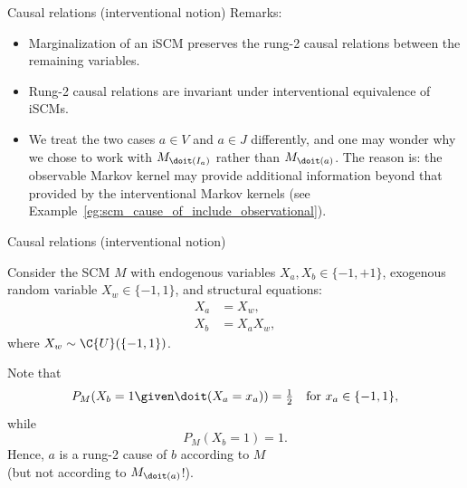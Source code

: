 \begin{frame}{Causal relations (interventional notion)}
  Remarks:
  \begin{itemize}
    \item Marginalization of an iSCM preserves the rung-2 causal relations between the remaining variables.
    \item Rung-2 causal relations are invariant under interventional equivalence of iSCMs.
    \item We treat the two cases $a \in V$ and $a \in J$ differently, and one may wonder why we chose to work with $M_{\doit(I_a)}$ rather than $M_{\doit(a)}$. 
      The reason is: the observable Markov kernel may provide additional information beyond that provided by the interventional Markov kernels (see Example~\ref{eg:scm_cause_of_include_observational}).
  \end{itemize}
\end{frame}

\begin{frame}{Causal relations (interventional notion)}
  \begin{Eg}[\ref{eg:scm_cause_of_include_observational}]
  Consider the SCM $M$ with endogenous variables $X_a, X_b \in \{-1,+1\}$, exogenous random variable $X_w \in \{-1,1\}$, and structural equations:
  \begin{align*}
    X_a &= X_w, \\
    X_b &= X_a X_w,
  \end{align*}
  where $X_w \sim \C{U}(\{-1,1\})$.

  Note that 
    $$P_M(X_b = 1 \given \doit(X_a = x_a)) = \tfrac{1}{2} \quad\text{for $x_a \in \{-1,1\}$},$$
  while
    $$P_M(X_b = 1) = 1.$$
  Hence, $a$ is a rung-2 cause of $b$ according to $M$\\
  (but not according to $M_{\doit(a)}$!).
\end{Eg}
\end{frame}

